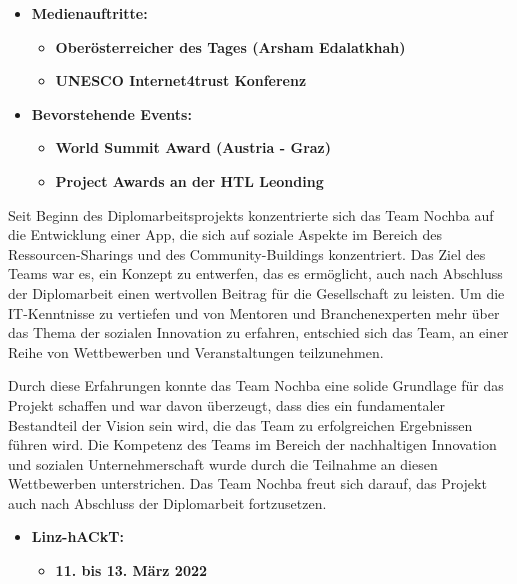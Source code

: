 \begin{itemize}
\begin{itemize}
          \end{itemize}
    \item \textbf{Medienauftritte:}
          \begin{itemize}
              \item \textbf{Oberösterreicher des Tages (Arsham Edalatkhah)}
              \item \textbf{UNESCO Internet4trust Konferenz}
          \end{itemize}
    \item \textbf{Bevorstehende Events:}
          \begin{itemize}
              \item \textbf{World Summit Award (Austria - Graz)}
              \item \textbf{Project Awards an der HTL Leonding}
          \end{itemize}
\end{itemize}

Seit Beginn des Diplomarbeitsprojekts konzentrierte sich das Team Nochba auf die Entwicklung einer App, die sich auf soziale Aspekte im Bereich des Ressourcen-Sharings und des Community-Buildings konzentriert. Das Ziel des Teams war es, ein Konzept zu entwerfen, das es ermöglicht, auch nach Abschluss der Diplomarbeit einen wertvollen Beitrag für die Gesellschaft zu leisten. Um die IT-Kenntnisse zu vertiefen und von Mentoren und Branchenexperten mehr über das Thema der sozialen Innovation zu erfahren, entschied sich das Team, an einer Reihe von Wettbewerben und Veranstaltungen teilzunehmen.

Durch diese Erfahrungen konnte das Team Nochba eine solide Grundlage für das Projekt schaffen und war davon überzeugt, dass dies ein fundamentaler Bestandteil der Vision sein wird, die das Team zu erfolgreichen Ergebnissen führen wird. Die Kompetenz des Teams im Bereich der nachhaltigen Innovation und sozialen Unternehmerschaft wurde durch die Teilnahme an diesen Wettbewerben unterstrichen. Das Team Nochba freut sich darauf, das Projekt auch nach Abschluss der Diplomarbeit fortzusetzen.

\begin{itemize}
    \item \textbf{Linz-hACkT:}
          \begin{itemize}
              \item \textbf{11. bis 13. März 2022}
          \end{itemize}
\end{itemize}

